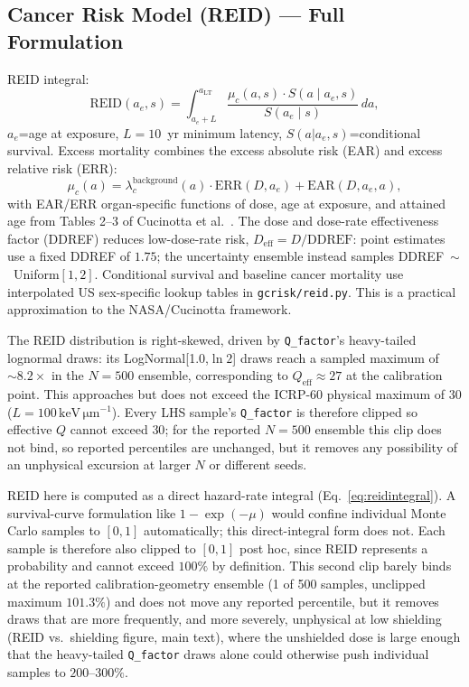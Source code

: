 \documentclass[a4paper,fleqn]{cas-sc}
\newcommand{\keVum}{\,\mathrm{keV\,\mu m^{-1}}}
\newcommand{\Qeff}{Q_\mathrm{eff}}
\newcommand{\code}[1]{\texttt{#1}}
\begin{document}
\subsection{Cancer Risk Model (REID) — Full Formulation}

REID integral:
\begin{equation}
  \mathrm{REID}(a_e, s) = \int_{a_e + L}^{a_\mathrm{LT}}
    \frac{\mu_c(a, s) \cdot S(a \mid a_e, s)}{S(a_e \mid s)} \, da,
  \label{eq:reidintegral}
\end{equation}
$a_e$=age at exposure, $L=10$~yr minimum latency, $S(a|a_e,s)$=conditional
survival. Excess mortality combines the excess absolute risk (EAR) and
excess relative risk (ERR):
\begin{equation}
  \mu_c(a) = \lambda_c^\mathrm{background}(a) \cdot \mathrm{ERR}(D, a_e)
           + \mathrm{EAR}(D, a_e, a),
\end{equation}
with EAR/ERR organ-specific functions of dose, age at exposure, and attained
age from Tables 2--3 of Cucinotta et al.\ \cite{cucinotta2013}. The dose and
dose-rate effectiveness factor (DDREF) reduces
low-dose-rate risk, $D_\mathrm{eff}=D/\mathrm{DDREF}$: point estimates use a
fixed DDREF of $1.75$; the uncertainty ensemble instead samples
DDREF~$\sim$~Uniform$[1,2]$. Conditional survival and baseline cancer
mortality use interpolated US sex-specific lookup tables in
\code{gcrisk/reid.py}. This is a practical approximation to the NASA/Cucinotta
framework.

The REID distribution is right-skewed, driven by \code{Q\_factor}'s
heavy-tailed lognormal draws: its LogNormal[1.0,$\ln 2$] draws reach a
sampled maximum of $\sim\!8.2\times$
in the $N=500$ ensemble, corresponding to $\Qeff\approx27$ at the
calibration point. This approaches but does not exceed the ICRP-60 physical
maximum of $30$ ($L=100\keVum$). Every LHS sample's \code{Q\_factor} is
therefore clipped so effective $Q$ cannot exceed $30$; for the reported
$N=500$ ensemble this clip does not bind, so reported percentiles are
unchanged, but it removes any possibility of an unphysical excursion at
larger $N$ or different seeds.

REID here is computed as a direct hazard-rate integral
(Eq.~\ref{eq:reidintegral}). A survival-curve formulation like
$1-\exp(-\mu)$ would confine individual Monte Carlo samples to $[0,1]$
automatically; this direct-integral form does not. Each sample is
therefore also clipped to $[0,1]$ post hoc, since REID represents a
probability and cannot exceed $100\%$ by definition. This second clip
barely binds at the reported calibration-geometry ensemble (1 of 500
samples, unclipped maximum $101.3\%$) and does not move any reported
percentile, but it removes draws that are more frequently, and more
severely, unphysical at low shielding (REID vs.\ shielding figure, main
text), where the unshielded dose is large enough that the heavy-tailed
\code{Q\_factor} draws alone could otherwise push individual samples to
$200$--$300\%$.
\end{document}
